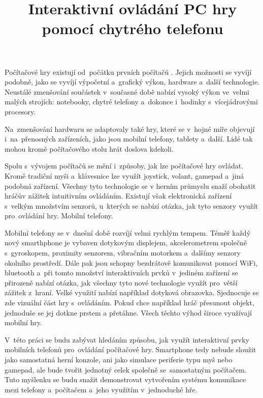 \documentclass[thesis=B,czech,hidelinks]{FITthesis}[2012/06/26] %
\title{Interaktivn{\' i} ovl{\' a}d{\' a}n{\' i} PC hry pomoc{\' i} chytr{\' e}ho telefonu}
\begin{document}


\begin{introduction}

Počítačové hry existují od~počátku prvních počítačů \cite{rylich}. Jejich možnosti se vyvíjí podobně, jako se vyvíjí výpočetní a~grafický výkon, hardware a~další technologie. Neustálé zmenšování součástek v~současné době nabízí vysoký výkon ve~velmi malých strojích: notebooky, chytré telefony a~dokonce i~hodinky s~vícejádrovými procesory. \cite{kupi}

Na~zmenšování hardwaru se adaptovaly také hry, které se v~hojné míře objevují i~na~přenosných zařízeních, jako jsou mobilní telefony, tablety a~další. Lidé tak mohou kromě počítačového stolu hrát doslova kdekoli.

Spolu s~vývojem počítačů se mění i~způsoby, jak lze počítačové hry ovládat. Kromě tradiční myši a~klávesnice lze využít joystick, volant, gamepad a~jiná podobná zařízení. Všechny tyto technologie se v herním průmyslu snaží obohatit hráčův zážitek intuitivním ovládáním. Existují však elektronická zařízení s~velkým množstvím senzorů, u~kterých se nabízí otázka, jak tyto senzory využít pro~ovládání hry. Mobilní telefony.

Mobilní telefony se v~dnešní době rozvíjí velmi rychlým tempem. Téměř každý nový smarthphone je vybaven dotykovým displejem, akcelerometrem společně s~gyroskopem, proximity senzorem, vibračním motorkem a~dalšímy senzory okolního prostředí. Dále pak jsou schopny bezdrátově komunikovat pomocí WiFi, bluetooth a~při tomto množství interaktivních prvků v~jediném zařízení se přirozeně nabízí otázka, jak všechny tyto nové technologie využít pro~větší zážitek z~hraní. Velké využití nabízí například dotyková obrazovka. Sjednocuje se zde vizuální část hry s~ovládáním. Pokud chce například hráč přesunout objekt, jednoduše se jej dotkne prstem a přetáhne. Všech těchto výhod široce využívají mobilní hry.

V~této práci se budu zabývat hledáním způsobu, jak využít interaktivní prvky mobilních telefonů pro~ovládání počítačové hry. Smartphone tedy nebude sloužit jako samostatná herní konzole, ani jako simulace periferie typu myš nebo gamepad, ale bude tvořit jednotný celek společně se~samostatným počítačem. Tuto myšlenku se budu snažit demonstrovat vytvořením systému komunikace mezi telefony a~počítačem a~jeho využitím v~jednoduché hře. 


\end{introduction}
\end{document}
